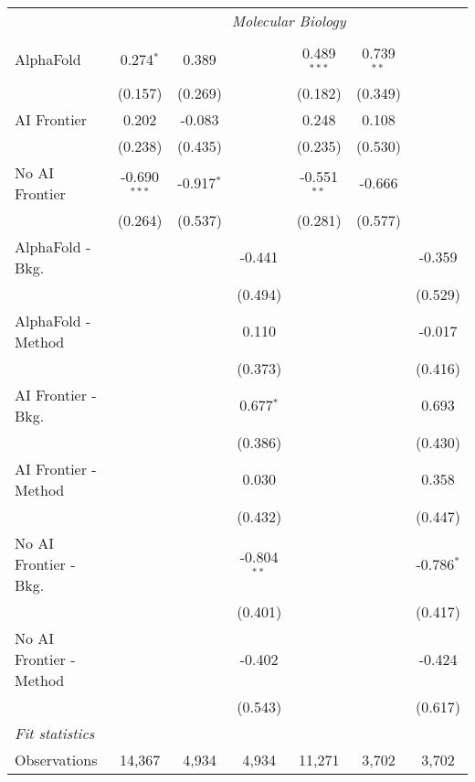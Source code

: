 \begin{tabular}{lcccccc}
 & \multicolumn{6}{c}{\textit{Molecular Biology}} \\ \\
   AlphaFold               & 0.274$^{*}$    & 0.389        &               & 0.489$^{***}$ & 0.739$^{**}$ &   \\   
                           & (0.157)        & (0.269)      &               & (0.182)       & (0.349)      &   \\   
   AI Frontier             & 0.202          & -0.083       &               & 0.248         & 0.108        &   \\   
                           & (0.238)        & (0.435)      &               & (0.235)       & (0.530)      &   \\   
   No AI Frontier          & -0.690$^{***}$ & -0.917$^{*}$ &               & -0.551$^{**}$ & -0.666       &   \\   
                           & (0.264)        & (0.537)      &               & (0.281)       & (0.577)      &   \\   
   AlphaFold - Bkg.        &                &              & -0.441        &               &              & -0.359\\   
                           &                &              & (0.494)       &               &              & (0.529)\\   
   AlphaFold - Method      &                &              & 0.110         &               &              & -0.017\\   
                           &                &              & (0.373)       &               &              & (0.416)\\   
   AI Frontier - Bkg.      &                &              & 0.677$^{*}$   &               &              & 0.693\\   
                           &                &              & (0.386)       &               &              & (0.430)\\   
   AI Frontier - Method    &                &              & 0.030         &               &              & 0.358\\   
                           &                &              & (0.432)       &               &              & (0.447)\\   
   No AI Frontier - Bkg.   &                &              & -0.804$^{**}$ &               &              & -0.786$^{*}$\\   
                           &                &              & (0.401)       &               &              & (0.417)\\   
   No AI Frontier - Method &                &              & -0.402        &               &              & -0.424\\   
                           &                &              & (0.543)       &               &              & (0.617)\\   
   \midrule
   \emph{Fit statistics}\\
   Observations            & 14,367         & 4,934        & 4,934         & 11,271        & 3,702        & 3,702\\  
   

\end{tabular}

